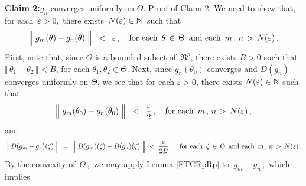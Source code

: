 \vskip 0.5cm
\noindent
\textbf{Claim 2:}\quad $g_{n}$ converges uniformly on $\Theta$.
\vskip 0.1cm
\noindent
Proof of Claim 2:\quad
We need to show that, for each \,$\varepsilon > 0$,\, there exists \,$N(\varepsilon) \in \mathbb{N}$\, such that
\begin{equation*}
\left\Vert\;g_{m}(\theta) \overset{{\color{white}.}}{-} g_{n}(\theta)\;\right\Vert \;\; < \;\; \varepsilon\,,
\quad
\textnormal{for each \,$\theta \,\in\, \Theta$\, and each \,$m\,,\,n \,>\, N(\varepsilon)$}\,.
\end{equation*}
First, note that, since $\Theta$ is a bounded subset of \,$\Re^{p}$, there exists $B > 0$ such that
$\Vert\,\theta_{1} - \theta_{2}\,\Vert < B$, for each $\theta_{1}, \theta_{2}\in\Theta$.
Next, since $g_{n}(\theta_{0})$ converges and $D(g_{n})$ converges uniformly on $\Theta$,
we see that for each $\varepsilon > 0$, there exists $N(\varepsilon) \in \mathbb{N}$ such that
\begin{equation*}
\left\Vert\;g_{m}(\theta_{0}) \overset{{\color{white}.}}{-} g_{n}(\theta_{0})\;\right\Vert \;\; < \;\; \dfrac{\varepsilon}{2}\,,
\quad
\textnormal{for each \,$m\,,\,n \,>\, N(\varepsilon)$}\,,
\end{equation*}
and
\begin{equation*}
\left\Vert\; D(g_{m} \overset{{\color{white}.}}{-} g_{n})(\zeta) \;\right\Vert
\; = \;
	\left\Vert\;D(g_{m})(\zeta) \overset{{\color{white}.}}{-} D(g_{n})(\zeta)\;\right\Vert
\; < \;
	\dfrac{\varepsilon}{2 B}\,,
\quad
\textnormal{for each \,$\zeta \,\in\, \Theta$\, and each \,$m\,,\,n \,>\, N(\varepsilon)$}\,.
\end{equation*}
By the convexity of \,$\Theta$\,,\, we may apply Lemma \ref{FTCRpRp} to \,$g_{m} - g_{n}$\,,\,
which implies
